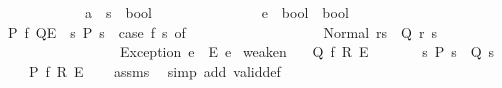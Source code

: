\begin{isabellebody}
\ \ \ \ \ \ \ \ \ \ \ \ \ {\isacharparenleft}{\kern0pt}{\isacharprime}{\kern0pt}a\ {\isasymRightarrow}\ {\isacharprime}{\kern0pt}s\ {\isasymRightarrow}\ bool{\isacharparenright}{\kern0pt}\ {\isasymRightarrow}\ \isanewline
\ \ \ \ \ \ \ \ \ \ \ \ \ {\isacharparenleft}{\kern0pt}{\isacharprime}{\kern0pt}e\ {\isasymRightarrow}\ bool{\isacharparenright}{\kern0pt}\ {\isasymRightarrow}\ bool{\isachardoublequoteclose}\ \isanewline
\ \ {\isacharparenleft}{\kern0pt}{\isachardoublequoteopen}{\isasymlbrace}{\isacharunderscore}{\kern0pt}{\isasymrbrace}{\isacharslash}{\kern0pt}\ {\isacharunderscore}{\kern0pt}\ {\isacharslash}{\kern0pt}{\isacharparenleft}{\kern0pt}{\isasymlbrace}{\isacharunderscore}{\kern0pt}{\isasymrbrace}{\isacharcomma}{\kern0pt}{\isacharslash}{\kern0pt}\ {\isasymlbrace}{\isacharunderscore}{\kern0pt}{\isasymrbrace}{\isacharparenright}{\kern0pt}{\isachardoublequoteclose}{\isacharparenright}{\kern0pt}\isanewline
{}\isanewline
\ \ {\isachardoublequoteopen}{\isasymlbrace}P{\isasymrbrace}\ f\ {\isasymlbrace}Q{\isasymrbrace}{\isacharcomma}{\kern0pt}{\isasymlbrace}E{\isasymrbrace}\ {\isasymequiv}\ {\isasymforall}s{\isachardot}{\kern0pt}\ P\ s\ {\isasymlongrightarrow}\ {\isacharparenleft}{\kern0pt}case\ f\ s\ of\isanewline
\ \ \ \ \ \ \ \ \ \ \ \ \ \ \ \ \ \ \ Normal\ {\isacharparenleft}{\kern0pt}r{\isacharcomma}{\kern0pt}s{\isacharprime}{\kern0pt}{\isacharparenright}{\kern0pt}\ {\isasymRightarrow}\ Q\ r\ s{\isacharprime}{\kern0pt}\isanewline
\ \ \ \ \ \ \ \ \ \ \ \ \ \ \ \ \ {\isacharbar}{\kern0pt}\ Exception\ e\ {\isasymRightarrow}\ E\ e{\isacharparenright}{\kern0pt}{\isachardoublequoteclose}\isanewline
\isanewline
{}\isamarkupfalse%
\ weaken{\isacharcolon}{\kern0pt}\isanewline
\ \ \ {\isachardoublequoteopen}{\isasymlbrace}Q{\isasymrbrace}\ f\ {\isasymlbrace}R{\isasymrbrace}{\isacharcomma}{\kern0pt}\ {\isasymlbrace}E{\isasymrbrace}{\isachardoublequoteclose}\isanewline
\ \ \ \ \ \ \ {\isachardoublequoteopen}{\isasymforall}s{\isachardot}{\kern0pt}\ P\ s\ {\isasymlongrightarrow}\ Q\ s{\isachardoublequoteclose}\isanewline
\ \ \ \ \ {\isachardoublequoteopen}{\isasymlbrace}P{\isasymrbrace}\ f\ {\isasymlbrace}R{\isasymrbrace}{\isacharcomma}{\kern0pt}\ {\isasymlbrace}E{\isasymrbrace}{\isachardoublequoteclose}\isanewline
%
\isadelimproof
\ \ %
\endisadelimproof
%
\isatagproof
{}\isamarkupfalse%
\ assms\ \isamarkupfalse%
\ {\isacharparenleft}{\kern0pt}simp\ add{\isacharcolon}{\kern0pt}\ valid{\isacharunderscore}{\kern0pt}def{\isacharparenright}{\kern0pt}%

\end{isabellebody}
